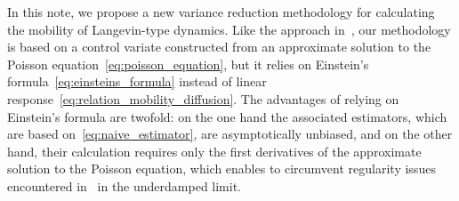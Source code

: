 \documentclass[11pt,a4paper]{article}
\theoremstyle{plain}
\numberwithin{equation}{section}
\begin{document}
In this note,
we propose a new variance reduction methodology for calculating the mobility of Langevin-type dynamics.
Like the approach in~\cite{roussel_thesis},
our methodology is based on a control variate constructed from an approximate solution to the Poisson equation~\eqref{eq:poisson_equation},
but it relies on Einstein's formula~\eqref{eq:einsteins_formula} instead of linear response~\eqref{eq:relation_mobility_diffusion}.
The advantages of relying on Einstein's formula are twofold:
on the one hand the associated estimators, which are based on~\eqref{eq:naive_estimator},
are asymptotically unbiased,
and on the other hand,
their calculation requires only the first derivatives of the approximate solution to the Poisson equation,
which enables to circumvent regularity issues encountered in~\cite{roussel_thesis} in the underdamped limit.

\end{document}
